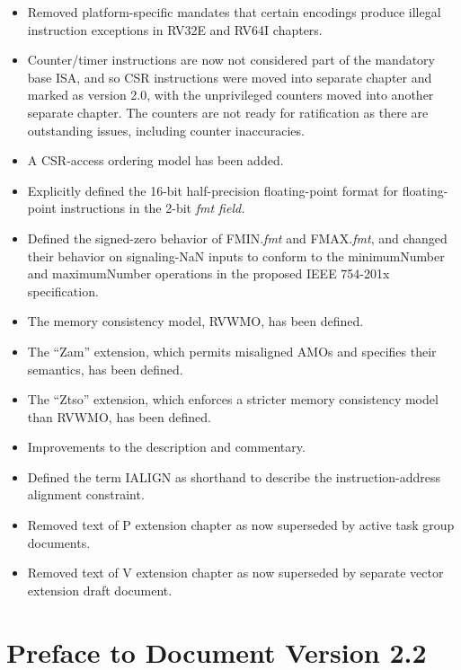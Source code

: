 \begin{itemize}
\item Removed platform-specific mandates that certain encodings
  produce illegal instruction exceptions in RV32E and RV64I chapters.
\item Counter/timer instructions are now not considered part of the
  mandatory base ISA, and so CSR instructions were moved into separate
  chapter and marked as version 2.0, with the unprivileged counters
  moved into another separate chapter.  The counters are not ready for
  ratification as there are outstanding issues, including counter
  inaccuracies.
\item A CSR-access ordering model has been added.
\item Explicitly defined the 16-bit half-precision floating-point
  format for floating-point instructions in the 2-bit {\em fmt field.}
\item Defined the signed-zero behavior of FMIN.{\em fmt} and FMAX.{\em fmt},
  and changed their behavior on signaling-NaN inputs to conform to the
  minimumNumber and maximumNumber operations in the proposed IEEE 754-201x
  specification.
\item The memory consistency model, RVWMO, has been defined.
\item The ``Zam'' extension, which permits misaligned AMOs and specifies their semantics, has been defined.
\item The ``Ztso'' extension, which enforces a stricter memory consistency model than RVWMO, has been defined.
\item Improvements to the description and commentary.
\item Defined the term IALIGN as shorthand to describe the instruction-address
  alignment constraint.
\item Removed text of P extension chapter as now superseded by active task
  group documents.
\item Removed text of V extension chapter as now superseded by separate vector
  extension draft document.
\end{itemize}

\section*{Preface to Document Version 2.2}

